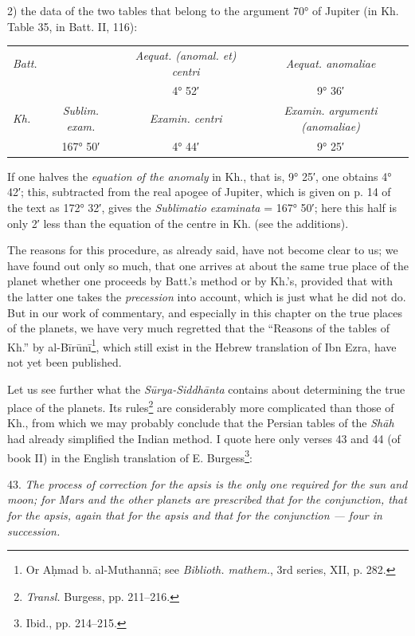 \documentclass[11pt]{article}
\newcommand{\Pg}[1]{\marginpar{\footnotesize\color{gray}#1}}
\begin{document}
\par 2) the data of the two tables that belong to the argument 70° of Jupiter (in Kh. Table 35, in Batt. II, 116):\par
\begin{center}\small\begin{tabular}{lccc}
\emph{Batt.} &  & \emph{Aequat. (anomal. et) centri} & \emph{Aequat. anomaliae} \\
 &  & 4° 52′ & 9° 36′ \\
\emph{Kh.} & \emph{Sublim. exam.} & \emph{Examin. centri} & \emph{Examin. argumenti (anomaliae)} \\
 & 167° 50′ & 4° 44′ & 9° 25′ \\
\end{tabular}\end{center}
\par If one halves the \emph{equation of the anomaly} in Kh., that is, 9° 25′, one obtains 4° 42′; this, subtracted from the real apogee of Jupiter, which is given on p. 14 of the text as 172° 32′, gives the \emph{Sublimatio examinata} = 167° 50′; here this half is only 2′ less than the equation of the centre in Kh. (see the additions).\par
\par \Pg{51}The reasons for this procedure, as already said, have not become clear to us; we have found out only so much, that one arrives at about the same true place of the planet whether one proceeds by Batt.'s method or by Kh.'s, provided that with the latter one takes the \emph{precession} into account, which is just what he did not do. But in our work of commentary, and especially in this chapter on the true places of the planets, we have very much regretted that the “Reasons of the tables of Kh.” by al-Bīrūnī\footnote{Or Aḥmad b. al-Muthannā; see \emph{Biblioth. mathem.}, 3rd series, XII, p. 282.}, which still exist in the Hebrew translation of Ibn Ezra, have not yet been published.\par
\par Let us see further what the \emph{Sūrya-Siddhānta} contains about determining the true place of the planets. Its rules\footnote{\emph{Transl.} Burgess, pp. 211–216.} are considerably more complicated than those of Kh., from which we may probably conclude that the Persian tables of the \emph{Shāh} had already simplified the Indian method. I quote here only verses 43 and 44 (of book II) in the English translation of E. Burgess\footnote{Ibid., pp. 214–215.}:\par
\par 43. \emph{The process of correction for the apsis is the only one required for the sun and moon; for Mars and the other planets are prescribed that for the conjunction, that for the apsis, again that for the apsis and that for the conjunction — four in succession.}\par
\end{document}

